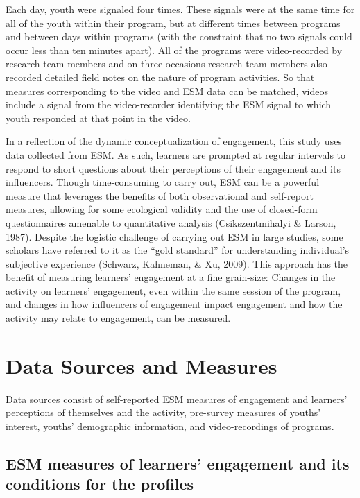 \documentclass[]{book}
\theoremstyle{definition}
\theoremstyle{definition}
\theoremstyle{definition}
\theoremstyle{remark}
\begin{document}
Each day, youth were signaled four times. These signals were at the same
time for all of the youth within their program, but at different times
between programs and between days within programs (with the constraint
that no two signals could occur less than ten minutes apart). All of the
programs were video-recorded by research team members and on three
occasions research team members also recorded detailed field notes on
the nature of program activities. So that measures corresponding to the
video and ESM data can be matched, videos include a signal from the
video-recorder identifying the ESM signal to which youth responded at
that point in the video.

In a reflection of the dynamic conceptualization of engagement, this
study uses data collected from ESM. As such, learners are prompted at
regular intervals to respond to short questions about their perceptions
of their engagement and its influencers. Though time-consuming to carry
out, ESM can be a powerful measure that leverages the benefits of both
observational and self-report measures, allowing for some ecological
validity and the use of closed-form questionnaires amenable to
quantitative analysis (Csikszentmihalyi \& Larson, 1987). Despite the
logistic challenge of carrying out ESM in large studies, some scholars
have referred to it as the ``gold standard'' for understanding
individual's subjective experience (Schwarz, Kahneman, \& Xu, 2009).
This approach has the benefit of measuring learners' engagement at a
fine grain-size: Changes in the activity on learners' engagement, even
within the same session of the program, and changes in how influencers
of engagement impact engagement and how the activity may relate to
engagement, can be measured.

\section{Data Sources and Measures}\label{data-sources-and-measures}

Data sources consist of self-reported ESM measures of engagement and
learners' perceptions of themselves and the activity, pre-survey
measures of youths' interest, youths' demographic information, and
video-recordings of programs.

\subsection{ESM measures of learners' engagement and its conditions for
the
profiles}\label{esm-measures-of-learners-engagement-and-its-conditions-for-the-profiles}
\end{document}
